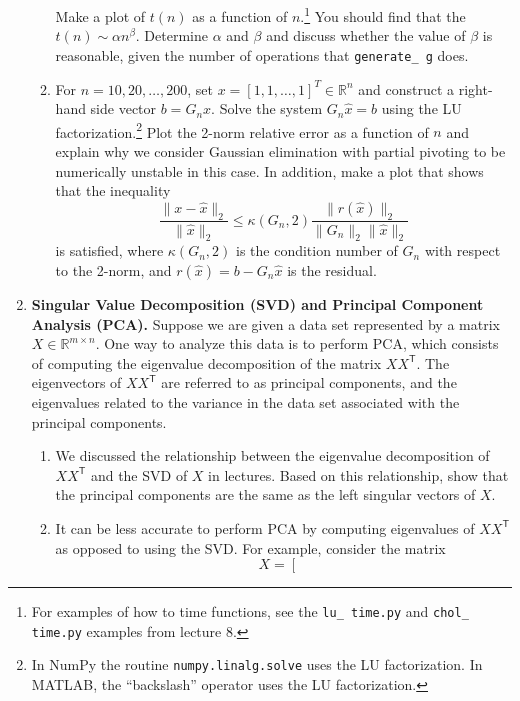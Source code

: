 \documentclass[11pt]{article}
\newcommand{\R}{\mathbb{R}}
\newcommand{\Trans}{\mathsf{T}}
\begin{document}
\begin{enumerate}
\begin{enumerate}
	Make a plot of $t(n)$ as a function of $n$.\footnote{For examples of
	how to time functions, see the \texttt{lu\_\,time.py} and
	\texttt{chol\_\,time.py} examples from lecture 8.} You should find that
	the $t(n)\sim \alpha n^\beta$. Determine $\alpha$ and $\beta$ and
	discuss whether the value of $\beta$ is reasonable, given the number of
	operations that \texttt{generate\_\,g} does.
      \item For $n = 10, 20, \ldots, 200$, set $x = [1,1,\ldots,1]^T \in \R^n$ and
	construct a right-hand side vector $b= G_n x$. Solve the system
	$G_n \hat{x} = b$ using the LU factorization.\footnote{In NumPy
	the routine \texttt{numpy.linalg.solve} uses the LU factorization.
	In MATLAB, the ``backslash'' operator uses the LU factorization.}
	Plot the 2-norm relative error as a function of $n$ and explain why
	we consider Gaussian elimination with partial pivoting to be
	numerically unstable in this case. In addition, make a plot that
	shows that the inequality
	\begin{equation}
	  \frac{\|x - \hat x\|_2}{\|\hat x\|_2} \leq \kappa(G_n,2)\frac{\|r(\hat x)\|_2}{\|G_n\|_2\|\hat x\|_2}
	\end{equation}
	is satisfied, where $\kappa(G_n,2)$ is the condition number of $G_n$
	with respect to the 2-norm, and $r(\hat{x})=b-G_n\hat{x}$ is the
	residual.
    \end{enumerate}
  \item {\bf Singular Value Decomposition (SVD) and Principal Component Analysis (PCA).} Suppose we are given a data set represented by a matrix $X \in \R^{m\times n}$. One way to analyze this data is to perform PCA, which consists of computing the eigenvalue decomposition of the matrix $XX^\Trans$. The eigenvectors of $XX^\Trans$ are referred to as principal components, and the eigenvalues related to the variance in the data set associated with the principal components.
    \begin{enumerate}
      \item We discussed the relationship between the eigenvalue decomposition
	of $XX^\Trans$ and the SVD of $X$ in lectures. Based on this
	relationship, show that the principal components are the same as the
	left singular vectors of $X$.
      \item It can be less accurate to perform PCA by computing eigenvalues of
	$XX^\Trans$ as opposed to using the SVD. For example, consider the
	matrix
	\begin{equation}
	  X =
	  \left[
	  \begin{array}{ccccc}

\end{array}
\end{equation}
\end{enumerate}
\end{enumerate}
\end{document}
